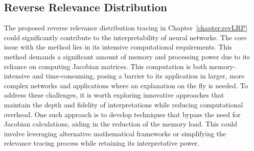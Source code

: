 \subsection{Reverse Relevance Distribution}
\label{dis:jac}
The proposed reverse relevance distribution tracing in Chapter~\ref{chapter:revLRP} could significantly contribute to the interpretability of neural networks. The core issue with the method lies in its intensive computational requirements. This method demands a significant amount of memory and processing power due to its reliance on computing Jacobian matrices. This computation is both memory-intensive and time-consuming, posing a barrier to its application in larger, more complex networks and applications where an explanation on the fly is needed. To address these challenges, it is worth exploring innovative approaches that maintain the depth and fidelity of interpretations while reducing computational overhead. One such approach is to develop techniques that bypass the need for Jacobian calculations, aiding in the reduction of the memory load. This could involve leveraging alternative mathematical frameworks or simplifying the relevance tracing process while retaining its interpretative power.



